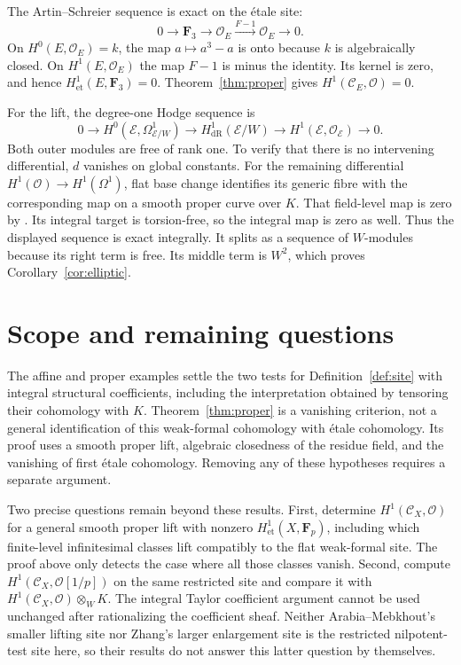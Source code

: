 \documentclass[11pt]{article}
\newcommand{\OO}{\mathcal O}\newcommand{\CC}{\mathcal C}
\newcommand{\dR}{\mathrm{dR}}\newcommand{\et}{\mathrm{et}}
\theoremstyle{definition}\newtheorem{definition}[theorem]{Definition}
\theoremstyle{remark}\newtheorem{remark}[theorem]{Remark}
\begin{document}
The Artin--Schreier sequence is exact on the \'etale site:
\[
 0\longrightarrow\mathbf F_3\longrightarrow\OO_E
    \xrightarrow{F-1}\OO_E\longrightarrow0.
\]
On $H^0(E,\OO_E)=k$, the map $a\mapsto a^3-a$ is onto because $k$ is algebraically closed. On $H^1(E,\OO_E)$ the map $F-1$ is minus the identity. Its kernel is zero, and hence $H^1_{\et}(E,\mathbf F_3)=0$. Theorem~\ref{thm:proper} gives $H^1(\CC_E,\OO)=0$.

For the lift, the degree-one Hodge sequence is
\[
 0\longrightarrow H^0(\mathcal E,\Omega^1_{\mathcal E/W})
 \longrightarrow H^1_{\dR}(\mathcal E/W)
 \longrightarrow H^1(\mathcal E,\OO_{\mathcal E})
 \longrightarrow0.
\]
Both outer modules are free of rank one. To verify that there is no intervening differential, $d$ vanishes on global constants. For the remaining differential $H^1(\OO)\to H^1(\Omega^1)$, flat base change identifies its generic fibre with the corresponding map on a smooth proper curve over $K$. That field-level map is zero by \citet[Lemma~50.20.3, Tag~0FW6]{Stacks}. Its integral target is torsion-free, so the integral map is zero as well. Thus the displayed sequence is exact integrally. It splits as a sequence of $W$-modules because its right term is free. Its middle term is $W^2$, which proves Corollary~\ref{cor:elliptic}.

\section{Scope and remaining questions}

The affine and proper examples settle the two tests for Definition~\ref{def:site} with integral structural coefficients, including the interpretation obtained by tensoring their cohomology with $K$. Theorem~\ref{thm:proper} is a vanishing criterion, not a general identification of this weak-formal cohomology with \'etale cohomology. Its proof uses a smooth proper lift, algebraic closedness of the residue field, and the vanishing of first \'etale cohomology. Removing any of these hypotheses requires a separate argument.

Two precise questions remain beyond these results. First, determine $H^1(\CC_X,\OO)$ for a general smooth proper lift with nonzero $H^1_{\et}(X,\mathbf F_p)$, including which finite-level infinitesimal classes lift compatibly to the flat weak-formal site. The proof above only detects the case where all those classes vanish. Second, compute $H^1(\CC_X,\OO[1/p])$ on the same restricted site and compare it with $H^1(\CC_X,\OO)\otimes_WK$. The integral Taylor coefficient argument cannot be used unchanged after rationalizing the coefficient sheaf. Neither Arabia--Mebkhout's smaller lifting site nor Zhang's larger enlargement site is the restricted nilpotent-test site here, so their results do not answer this latter question by themselves.
\end{document}
